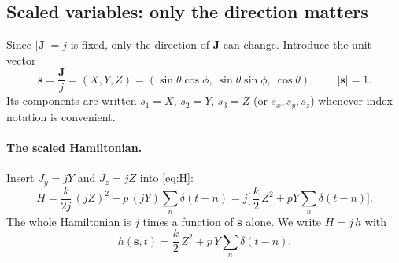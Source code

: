 \documentclass[11pt,a4paper]{article}
\newcommand{\vs}{\bm{s}}
\newcommand{\vJ}{\bm{J}}
\begin{document}
\subsection{Scaled variables: only the direction matters}\label{sec:scaled}

Since $|\vJ| = j$ is fixed, only the direction of $\vJ$ can change. Introduce the unit vector
\begin{equation}\label{eq:unit}
  \vs = \frac{\vJ}{j} = (X, Y, Z) = (\sin\theta\cos\phi,\ \sin\theta\sin\phi,\ \cos\theta), \qquad |\vs| = 1 .
\end{equation}
Its components are written $s_1 = X$, $s_2 = Y$, $s_3 = Z$ (or $s_x, s_y, s_z$) whenever index notation is
convenient.

\paragraph{The scaled Hamiltonian.} Insert $J_y = jY$ and $J_z = jZ$ into \eqref{eq:H}:
\begin{equation*}
  H = \frac{k}{2j}\,(jZ)^2 + p\,(jY) \sum_n\delta(t-n)
    = j\Big[\,\frac{k}{2}\,Z^2 + pY \sum_n\delta(t-n)\Big].
\end{equation*}
The whole Hamiltonian is $j$ times a function of $\vs$ alone. We write $H = j\,h$ with
\begin{equation}\label{eq:h}
  h(\vs,t) = \frac{k}{2}\, Z^2 + p\, Y \sum_n \delta(t-n).
\end{equation}
\end{document}
